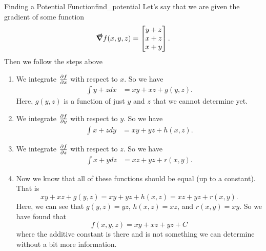                    	        \begin{ex}{Finding a Potential Function}{find_potential}
                   	        Let's say that we are given the gradient of some function
                   	        \[
                   	        \boldsymbol{\vec{\nabla}} f(x,y,z) = \begin{bmatrix} y+z \\ x+z \\ x+y \end{bmatrix}.
                   	        \]
                   	        Then we follow the steps above
                   	        \begin{enumerate}[1.]
                   	            \item We integrate $\frac{\partial f}{\partial x}$ with respect to $x$.  So we have
                   	            \begin{align*}
                   	                \int y+z dx &= xy+xz + g(y,z).
                   	            \end{align*}
                   	            Here, $g(y,z)$ is a function of just $y$ and $z$ that we cannot determine yet.
                   	            \item We integrate $\frac{\partial f}{\partial y}$ with respect to $y$. So we have
                   	            \begin{align*}
                   	                \int x+z dy &= xy+yz + h(x,z).
                   	            \end{align*}
                   	            \item We integrate $\frac{\partial f}{\partial z}$ with respect to $z$. So we have
                   	            \begin{align*}
                   	                \int x+y dz &= xz+yz + r(x,y).
                   	            \end{align*}
                   	            \item Now we know that all of these functions should be equal (up to a constant).  That is
                   	            \[
                   	            xy+xz+g(y,z)=xy+yz+h(x,z)=xz+yz+r(x,y).
                   	            \]
                   	            Here, we can see that $g(y,z)=yz$, $h(x,z)=xz$, and $r(x,y)=xy$.  So we have found that
                   	            \[
                   	            f(x,y,z) = xy + xz + yz + C
                   	            \]
                   	            where the additive constant is there and is not something we can determine without a bit more information.
                   	        \end{enumerate}
                   	        \end{ex}

